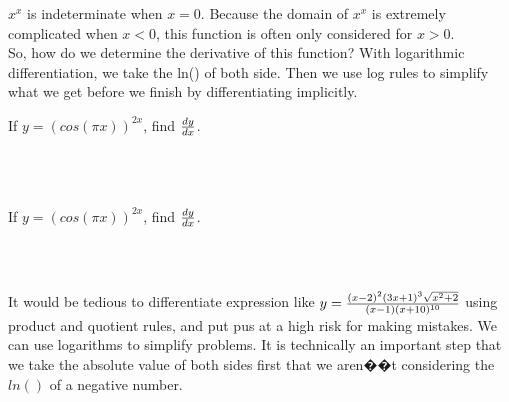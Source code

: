 $ x^x $ is indeterminate when $ x = 0 $. Because the domain of $ x^x $ is extremely complicated when $ x < 0 $, this function is often only considered for $ x > 0 $. \\

So, how do we determine the derivative of this function? With logarithmic differentiation, we take the ln() of both side. Then we use log rules to simplify what we get before we finish by differentiating implicitly. \\

\begin{exercise}\nonumber
    If $ y = (cos(\pi x))^{2x} $, find $  dy \over dx $.

    \begin{align}
        \\
        \\
        \\
        \\
        \\
        \\
    \end{align}
\end{exercise}

\begin{exercise}\nonumber
    If $ y = \left(cos(\pi x)\right)^{2x} $, find $  dy \over dx $.

    \begin{align}
        \\
        \\
        \\
        \\
        \\
    \end{align}
\end{exercise}

It would be tedious to differentiate expression like $ y = {(x-2)^2(3x+1)^3\sqrt{x^2+2} \over (x-1)(x+10)^{10}} $ using product and quotient rules, and put pus at a high risk for making mistakes. We can use logarithms to simplify problems. It is technically an important step that we take the absolute value of both sides first that we aren��t considering the $ ln() $ of a negative number. \\


